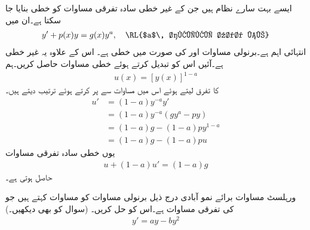 ایسے بہت سارے نظام ہیں جن کے غیر خطی سادہ تفرقی مساوات کو خطی بنایا جا سکتا ہے۔ان میں  
\begin{align}\label{مساوات_سادہ_اول_برنولی_الف}
y'+p(x)y=g(x)y^a,\quad \text{\RL{$a$\, حقیقی عدد ہے}}
\end{align}
انتہائی اہم ہے۔برنولی مساوات  اور  کی صورت میں خطی ہے۔ اس کے علاوہ یہ غیر خطی ہے۔آئیں اس کو تبدیل کرتے ہوئے خطی مساوات حاصل کریں۔ہم
\begin{align*}
u(x)=[y(x)]^{1-a}
\end{align*}
کا تفرق لیتے ہوئے اس میں مساوات  سے  پر کرتے  ہوئے ترتیب دیتے ہیں۔
\begin{align*}
u'&=(1-a)y^{-a}y'\\
&=(1-a)y^{-a}(gy^a-py)\\
&=(1-a)g-(1-a)py^{1-a}\\
&=(1-a)g-(1-a)pu
\end{align*} 
یوں خطی سادہ تفرقی مساوات 
\begin{align}
u+(1-a)u'=(1-a)g
\end{align}
حاصل ہوتی ہے۔

\quad ورہلسٹ مساوات برائے نمو آبادی
درج ذیل برنولی مساوات کو  مساوات کہتے ہیں جو  کی تفرقی مساوات ہے۔اس کو حل کریں۔ (سوال  کو بھی دیکھیں۔)
\begin{align}\label{مساوات_سادہ_اول_ورہلسٹ_آبادی_نمو_الف}
y'=ay-by^2
\end{align}

